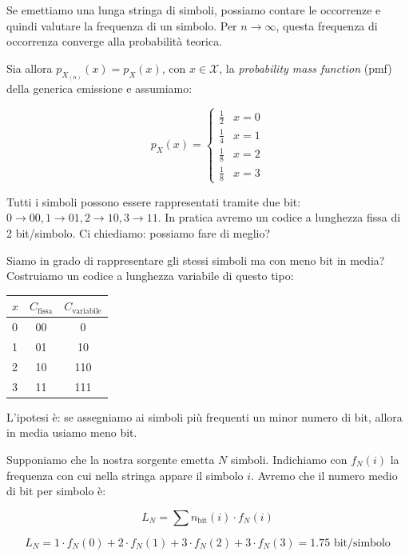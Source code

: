 Se emettiamo una lunga stringa di simboli, possiamo contare le occorrenze e quindi valutare la frequenza di un simbolo. Per $n \to \infty$, questa frequenza di occorrenza converge alla probabilità teorica.

Sia allora $p_{X_{(n)}}(x) = p_X(x)$, con $x \in \mathcal{X}$, la \textit{probability mass function} (pmf) della generica emissione e assumiamo:

\begin{equation}
p_X(x) = 
\begin{cases} 
\frac{1}{2} & x = 0 \\ 
\frac{1}{4} & x = 1 \\ 
\frac{1}{8} & x = 2 \\ 
\frac{1}{8} & x = 3 
\end{cases}
\end{equation}

Tutti i simboli possono essere rappresentati tramite due bit: $0 \to 00, 1 \to 01, 2 \to 10, 3 \to 11$. In pratica avremo un codice a lunghezza fissa di 2 bit/simbolo. Ci chiediamo: possiamo fare di meglio?

Siamo in grado di rappresentare gli stessi simboli ma con meno bit in media? Costruiamo un codice a lunghezza variabile di questo tipo:

\begin{center}
\renewcommand{\arraystretch}{1.5}
\begin{tabular}{lcc}
\toprule
$x$ & $C_{\text{fissa}}$ & $C_{\text{variabile}}$ \\
\midrule
0 & 00 & 0 \\
1 & 01 & 10 \\
2 & 10 & 110 \\
3 & 11 & 111 \\
\bottomrule
\end{tabular}
\end{center}

L'ipotesi è: se assegniamo ai simboli più frequenti un minor numero di bit, allora in media usiamo meno bit.

Supponiamo che la nostra sorgente emetta $N$ simboli. Indichiamo con $f_N(i)$ la frequenza con cui nella stringa appare il simbolo $i$. Avremo che il numero medio di bit per simbolo è:

\begin{equation}
L_N = \sum n_{\text{bit}}(i) \cdot f_N(i)
\end{equation}

\begin{equation*}
L_N = 1 \cdot f_N(0) + 2 \cdot f_N(1) + 3 \cdot f_N(2) + 3 \cdot f_N(3) = 1.75 \text{ bit/simbolo}
\end{equation*}

